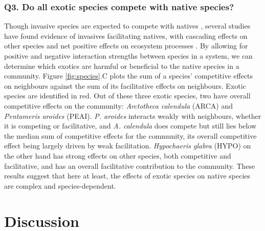 \documentclass[a4,12pt]{article}
\begin{document}
\begin{refsection}
    \subsubsection*{Q3. Do all exotic species compete with native species?}
    Though invasive species are expected to compete with natives \parencite{Naeem2000, Corbin2004, Riley2008, Zheng2015}, several studies have found evidence of invasives facilitating natives, with cascading effects on other species and net positive effects on ecosystem processes \parencite{Rodriguez2006, Ramus2017, Wainwright2019}. By allowing for positive and negative interaction strengths between species in a system, we can determine which exotics are harmful or beneficial to the native species in a community. Figure \ref{fig:species}.C plots the sum of a species' competitive effects on neighbours against the sum of its facilitative effects on neighbours. Exotic species are identified in red. Out of these three exotic species, two have overall competitive effects on the community: \textit{Arctotheca calendula} (ARCA) and \textit{Pentameris aroides} (PEAI). \textit{P. aroides} interacts weakly with neighbours, whether it is competing or facilitative, and \textit{A. calendula} does compete but still lies below the median sum of competitive effects for the community, its overall competitive effect being largely driven by weak facilitation. \textit{Hypochaeris glabra} (HYPO) on the other hand has strong effects on other species, both competitive and facilitative, and has an overall facilitative contribution to the community. These results suggest that here at least, the effects of exotic species on native species are complex and species-dependent.


\section{Discussion}



\end{refsection}
\end{document}
